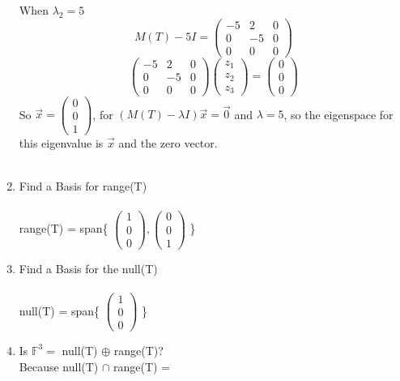 \documentclass[12pt]{article}
\begin{document}
\begin{enumerate}[label = (\alph*)]
		When $\lambda_2 = 5$
		$$
		M(T) - 5I = 
		\begin{pmatrix}
			-5 & 2 & 0 \\
			0 & -5 & 0 \\
			0 & 0 & 0
		\end{pmatrix}
		$$
		$$
		\begin{pmatrix}
		-5 & 2 & 0 \\
		0 & -5 & 0 \\
		0 & 0 & 0
		\end{pmatrix}
		\begin{pmatrix}
		z_1 \\
		z_2 \\
		z_3
		\end{pmatrix}
		= 
		\begin{pmatrix}
		0 \\
		0 \\
		0
		\end{pmatrix}
		$$
		So $\vec{x} = \begin{pmatrix}
		0 \\
		0 \\
		1
		\end{pmatrix}$, for $(M(T) - \lambda I)\vec{x} = \vec{0}$ and $\lambda = 5$, so the eigenspace for this eigenvalue is $\vec{x}$ and the zero vector. \\ \\
		\item Find a Basis for range(T) \\ \\
		range(T) = span\{ 
		$
		\begin{pmatrix}
			1 \\
			0 \\
			0
		\end{pmatrix},
		\begin{pmatrix}
			0 \\
			0 \\
			1
		\end{pmatrix}
		$
		\}
		\item Find a Basis for the null(T) \\ \\
		null(T) = span\{
		$
		\begin{pmatrix}
			1 \\
			0 \\
			0
		\end{pmatrix}
		$
		\}
		\item Is $\mathbb{F}^3 =$ null(T) $\oplus$ range(T)? \\
		Because null(T) $\cap$ range(T) = 

\end{enumerate}
\end{document}
